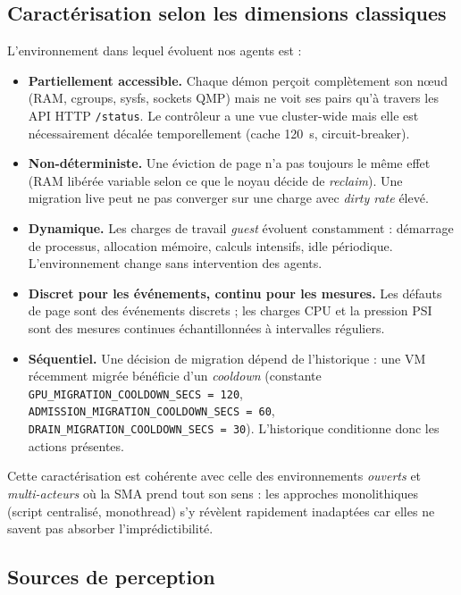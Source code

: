 \subsection{Caractérisation selon les dimensions classiques}

L'environnement dans lequel évoluent nos agents est :

\begin{itemize}[leftmargin=*]
    \item \textbf{Partiellement accessible.} Chaque démon perçoit complètement son nœud (RAM, cgroups, sysfs, sockets QMP) mais ne voit ses pairs qu'à travers les API HTTP \texttt{/status}. Le contrôleur a une vue cluster-wide mais elle est nécessairement décalée temporellement (cache 120~s, circuit-breaker).
    \item \textbf{Non-déterministe.} Une éviction de page n'a pas toujours le même effet (RAM libérée variable selon ce que le noyau décide de \emph{reclaim}). Une migration live peut ne pas converger sur une charge avec \emph{dirty rate} élevé.
    \item \textbf{Dynamique.} Les charges de travail \emph{guest} évoluent constamment : démarrage de processus, allocation mémoire, calculs intensifs, idle périodique. L'environnement change sans intervention des agents.
    \item \textbf{Discret pour les événements, continu pour les mesures.} Les défauts de page sont des événements discrets ; les charges CPU et la pression PSI sont des mesures continues échantillonnées à intervalles réguliers.
    \item \textbf{Séquentiel.} Une décision de migration dépend de l'historique : une VM récemment migrée bénéficie d'un \emph{cooldown} (constante \texttt{GPU\_MIGRATION\_COOLDOWN\_SECS = 120}, \texttt{ADMISSION\_MIGRATION\_COOLDOWN\_SECS = 60}, \texttt{DRAIN\_MIGRATION\_COOLDOWN\_SECS = 30}). L'historique conditionne donc les actions présentes.
\end{itemize}

Cette caractérisation est cohérente avec celle des environnements \emph{ouverts} et \emph{multi-acteurs} où la SMA prend tout son sens : les approches monolithiques (script centralisé, monothread) s'y révèlent rapidement inadaptées car elles ne savent pas absorber l'imprédictibilité.

\subsection{Sources de perception}

